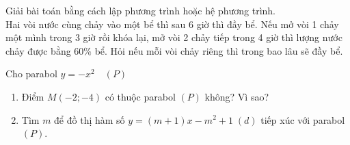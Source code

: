 \begin{ex}%
	Giải bài toán bằng cách lập phương trình hoặc hệ phương trình.\\
Hai vòi nước cùng chảy vào một bể thì sau 6 giờ thì đầy bể. Nếu mở vòi 1 chảy một mình trong 3 giờ rồi khóa lại, mở vòi 2 chảy tiếp trong 4 giờ thì lượng nước chảy được bằng $60\%$ bể. Hỏi nếu mỗi vòi chảy riêng thì trong bao lâu sẽ đầy bể.
\end{ex}
\begin{ex}%
	Cho parabol $y=-x^2\quad(P)$
	\begin{enumerate}
	\item Điểm $M\left(-2;-4\right)$ có thuộc parabol $(P)$ không? Vì sao?
	\item Tìm $m$ để đồ thị hàm số $y=\left(m+1\right)x-m^2+1\; (d)$ tiếp xúc với parabol $(P)$.
	\end{enumerate}
\end{ex}
